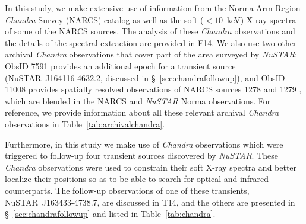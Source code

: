 \documentclass[iop,revtex4]{emulateapj}
\begin{document}
In this study, we make extensive use of information from the Norma Arm Region \textit{Chandra} Survey (NARCS) catalog as well as the soft ($<10$~keV) X-ray spectra of some of the NARCS sources.  The analysis of these \textit{Chandra} observations and the details of the spectral extraction are provided in F14.  We also use two other archival \textit{Chandra} observations that cover part of the area surveyed by \textit{NuSTAR}: ObsID 7591 provides an additional epoch for a transient source (NuSTAR~J164116-4632.2, discussed in \S~\ref{sec:chandrafollowup}), and ObsID 11008 provides spatially resolved observations of NARCS sources 1278 and 1279 \citep{rahoui14}, which are blended in the NARCS and \textit{NuSTAR} Norma observations.  For reference, we provide information about all these relevant archival \textit{Chandra} observations in Table~\ref{tab:archivalchandra}.  \par
Furthermore, in this study we make use of \textit{Chandra} observations which were triggered to follow-up four transient sources discovered by \textit{NuSTAR}.  These \textit{Chandra} observations were used to constrain their soft X-ray spectra and better localize their positions so as to be able to search for optical and infrared counterparts.  The follow-up observations of one of these transients, NuSTAR~J163433-4738.7, are discussed in T14, and the others are presented in \S~\ref{sec:chandrafollowup} and listed in Table~\ref{tab:chandra}.
\end{document}
